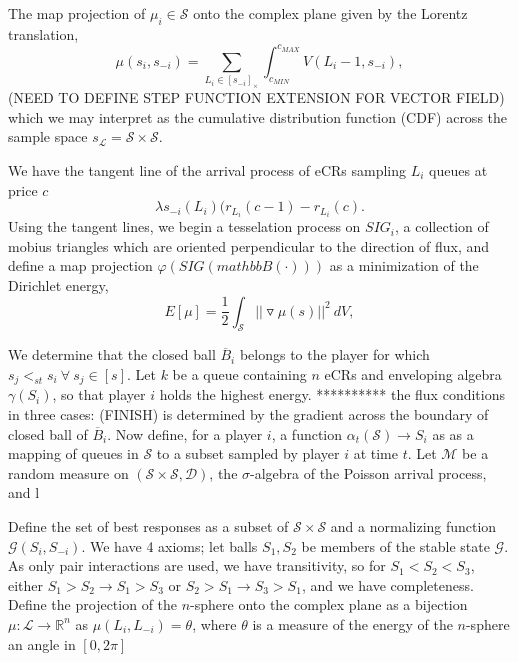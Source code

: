 \documentclass[10pt]{article}
\newcommand{\mcL}{\mathcal{L}}
\newcommand{\mcM}{\mathcal{M}}
\newcommand{\mcG}{\mathcal{G}}
\newcommand{\mcS}{\mathcal{S}}
\newcommand{\mcD}{\mathcal{D}}
\theoremstyle{definition}
\begin{document}
{
The map projection of $\mu_i\in \mcS$ onto the complex plane given by the Lorentz
translation,
$$ 
    \mu(s_i, s_{-i}) = \displaystyle\sum_{L_i \in [s_{-i}]_\times}
    \int_{c_{MIN}}^{c_{MAX}} V(L_i-1, s_{-i}),
$$
(NEED TO DEFINE STEP FUNCTION EXTENSION FOR VECTOR FIELD)
which we may interpret as the cumulative distribution function (CDF) across the
sample space $s_{\mcL} =\mcS\times \mcS$.



We have the tangent line of the arrival process of eCRs sampling $L_i$ queues at price $c$
$$
    \lambda s_{-i}(L_i)(r_{L_i}(c-1) - r_{L_i}(c).
$$
Using the tangent lines, we begin a tesselation process on $SIG_i$, a collection of
mobius triangles which are oriented perpendicular to the direction of flux, and
define a map projection $\varphi(SIG(mathbb{B}(\cdot)))$ as a minimization of the Dirichlet energy, 
$$
	E[\mu]  = \frac{1}{2} \displaystyle\int_{\mcS}
    \vert\vert\triangledown\mu(s)\vert
    \vert^2 \ dV,
$$


We determine that the closed ball $\overline{B}_i$ belongs to the player for which 
$s_j<_{st} s_i \ \forall \ s_j \in [s]$.
Let $k$ be a queue containing $n$ eCRs and enveloping algebra $\gamma(S_i)$,
so that player $i$ holds the highest energy.
********** the flux conditions in three cases: (FINISH) is determined by the gradient
across the boundary of closed ball of $\overline{B}_i$.
Now define, for a player $i$, a function
$\alpha_t(\mcS) \longrightarrow S_i$ as as a mapping of queues in $\mcS$ to a
subset sampled by player $i$ at time $t$. 
Let $\mcM$ be a random measure on $(\mcS \times \mcS, \mcD)$, the $\sigma$-algebra of the
Poisson arrival process, and l

Define the set of best responses as a subset of $\mcS\times\mcS$ and a normalizing function $\mcG(S_i, S_{-i})$. 
We have 4 axioms; let balls $S_1, S_2$ be members of the stable state $\mcG$. 
As only pair interactions are used, we have transitivity, so for $S_1 < S_2 < S_3$, 
either $S_1 > S_2 \rightarrow S_1 > S_3$ or $S_2 > S_1 \rightarrow S_3 > S_1$, 
and we have completeness. Define the projection of the $n$-sphere onto the complex plane as a bijection $\mu: \mcL \rightarrow \mathbb{R}^n$ as $\mu(L_i, L_{-i}) = \theta$, where $\theta$ is a measure of the energy of the $n$-sphere an angle in $[0,2\pi]$ 

}
\end{document}

